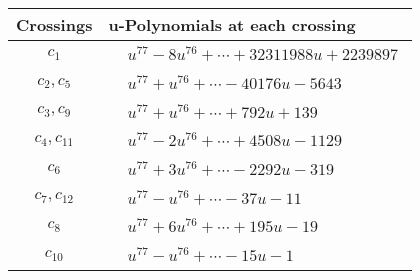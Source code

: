 \documentclass[1p]{elsarticle_modified}
\theoremstyle{definition}
\begin{document}
\begin{tabular}{m{50pt}|m{274pt}}
Crossings & \hspace{64pt}u-Polynomials at each crossing \\
\hline $$\begin{aligned}c_{1}\end{aligned}$$&$\begin{aligned}
&u^{77}-8 u^{76}+\cdots+32311988 u+2239897
\end{aligned}$\\
\hline $$\begin{aligned}c_{2},c_{5}\end{aligned}$$&$\begin{aligned}
&u^{77}+u^{76}+\cdots-40176 u-5643
\end{aligned}$\\
\hline $$\begin{aligned}c_{3},c_{9}\end{aligned}$$&$\begin{aligned}
&u^{77}+u^{76}+\cdots+792 u+139
\end{aligned}$\\
\hline $$\begin{aligned}c_{4},c_{11}\end{aligned}$$&$\begin{aligned}
&u^{77}-2 u^{76}+\cdots+4508 u-1129
\end{aligned}$\\
\hline $$\begin{aligned}c_{6}\end{aligned}$$&$\begin{aligned}
&u^{77}+3 u^{76}+\cdots-2292 u-319
\end{aligned}$\\
\hline $$\begin{aligned}c_{7},c_{12}\end{aligned}$$&$\begin{aligned}
&u^{77}- u^{76}+\cdots-37 u-11
\end{aligned}$\\
\hline $$\begin{aligned}c_{8}\end{aligned}$$&$\begin{aligned}
&u^{77}+6 u^{76}+\cdots+195 u-19
\end{aligned}$\\
\hline $$\begin{aligned}c_{10}\end{aligned}$$&$\begin{aligned}
&u^{77}- u^{76}+\cdots-15 u-1
\end{aligned}$\\
\hline
\end{tabular}\\~\\
\end{document}
